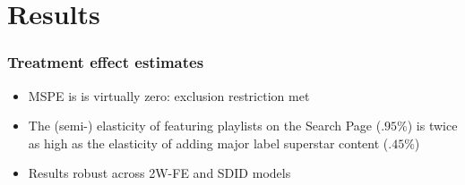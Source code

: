 \documentclass[8pt]{beamer}
\begin{document}

\section{Results}


\begin{frame}[label=shortversion]

    \frametitle{Treatment effect estimates}
    
    
    
    \vspace{0.1cm}
    
    \begin{itemize}
    \item MSPE is is virtually zero: exclusion restriction met
    \item The (semi-) elasticity of featuring playlists on the Search Page ($.95\%$) is twice as high as the elasticity of adding major label superstar content ($.45\%$)
    \item Results robust across 2W-FE and SDID models
    \end{itemize}
    
\end{frame}
    
\end{document}
